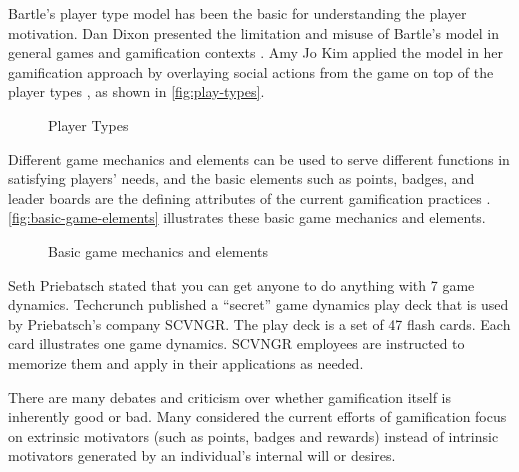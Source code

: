 Bartle's player type model has been the basic for understanding the player motivation. Dan Dixon presented the limitation and misuse of Bartle's model in general games and gamification contexts \cite{DixonPlayerType}. Amy Jo Kim applied the model in her gamification approach by overlaying social actions from the game on top of the player types \cite {Kim2010}, as shown in \autoref{fig:play-types}.

\begin{figure}[ht!]
	\centering
		\caption{Player Types}
		\label{fig:play-types}
\end{figure}

Different game mechanics and elements can be used to serve different functions in satisfying players' needs, and the basic elements such as points, badges, and leader boards are the defining attributes of the current gamification practices \cite {Deterding2011dragon}. \autoref{fig:basic-game-elements}  illustrates these basic game mechanics and elements.

\begin{figure}[ht!]
	\centering
		\caption{Basic game mechanics and elements}
		\label{fig:basic-game-elements}
\end{figure}

Seth Priebatsch \cite {Priebatsch2010ted} stated that you can get anyone to do anything with 7 game dynamics. Techcrunch \cite{Biggs2010} published a ``secret'' game dynamics play deck that is used by Priebatsch's company SCVNGR. The play deck is a set of 47 flash cards. Each card illustrates one game dynamics. SCVNGR employees are instructed to memorize them and apply in their applications as needed.  

There are many debates and criticism over whether gamification itself is inherently good or bad. 
Many considered the current efforts of gamification focus on extrinsic motivators (such as points, badges and rewards) instead of intrinsic motivators generated by an individual's internal will or desires.

